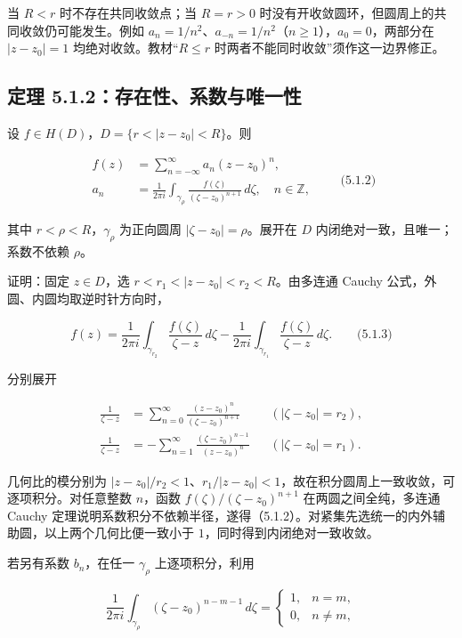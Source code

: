 \documentclass[11pt,a4paper]{article}
\begin{document}
当 \(R<r\) 时不存在共同收敛点；当 \(R=r>0\)
时没有开收敛圆环，但圆周上的共同收敛仍可能发生。例如
\(a_n=1/n^2\)、\(a_{-n}=1/n^2\)（\(n\ge1\)），\(a_0=0\)，两部分在
\(|z-z_0|=1\) 均绝对收敛。教材``\(R\le r\)
时两者不能同时收敛''须作这一边界修正。

\subsection{定理 5.1.2：存在性、系数与唯一性}\label{ch05-s1-heading-2}

设 \(f\in H(D)\)，\(D=\{r<|z-z_0|<R\}\)。则

\[
\begin{aligned}
f(z)&=\sum_{n=-\infty}^{\infty}a_n(z-z_0)^n,\\
a_n&=\frac1{2\pi i}\int_{\gamma_\rho}\frac{f(\zeta)}{(\zeta-z_0)^{n+1}}\,d\zeta,
\quad n\in\mathbb Z,
\end{aligned}
\qquad\text{(5.1.2)}
\]

其中 \(r<\rho<R\)，\(\gamma_\rho\) 为正向圆周
\(|\zeta-z_0|=\rho\)。展开在 \(D\) 内闭绝对一致，且唯一；系数不依赖
\(\rho\)。

证明：固定 \(z\in D\)，选 \(r<r_1<|z-z_0|<r_2<R\)。由多连通 Cauchy
公式，外圆、内圆均取逆时针方向时，

\[
f(z)=\frac1{2\pi i}\int_{\gamma_{r_2}}\frac{f(\zeta)}{\zeta-z}\,d\zeta
-\frac1{2\pi i}\int_{\gamma_{r_1}}\frac{f(\zeta)}{\zeta-z}\,d\zeta.
\qquad\text{(5.1.3)}
\]

分别展开

\[
\begin{aligned}
\frac1{\zeta-z}&=\sum_{n=0}^{\infty}\frac{(z-z_0)^n}{(\zeta-z_0)^{n+1}}
&&(|\zeta-z_0|=r_2),\\
\frac1{\zeta-z}&=-\sum_{n=1}^{\infty}\frac{(\zeta-z_0)^{n-1}}{(z-z_0)^n}
&&(|\zeta-z_0|=r_1).
\end{aligned}
\]

几何比的模分别为
\(|z-z_0|/r_2<1\)、\(r_1/|z-z_0|<1\)，故在积分圆周上一致收敛，可逐项积分。对任意整数
\(n\)，函数 \(f(\zeta)/(\zeta-z_0)^{n+1}\) 在两圆之间全纯，多连通 Cauchy
定理说明系数积分不依赖半径，遂得（5.1.2）。对紧集先选统一的内外辅助圆，以上两个几何比便一致小于
\(1\)，同时得到内闭绝对一致收敛。

若另有系数 \(b_n\)，在任一 \(\gamma_\rho\) 上逐项积分，利用

\[
\frac1{2\pi i}\int_{\gamma_\rho}(\zeta-z_0)^{n-m-1}\,d\zeta
=\begin{cases}1,&n=m,\\0,&n\ne m,\end{cases}
\]
\end{document}
